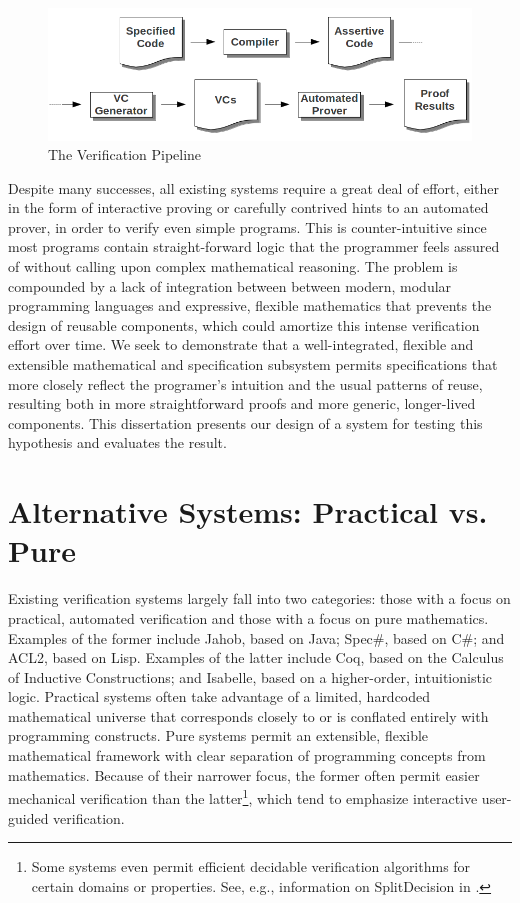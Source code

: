 \begin{figure}
  \centering
    \includegraphics[width=\textwidth]{verification_pipeline}
  \caption{The Verification Pipeline\label{fig:pipeline}}
\end{figure}

Despite many successes, all existing systems require a great deal of effort, either in the form of interactive proving or carefully contrived hints to an automated prover, in order to verify even simple programs.  This is counter-intuitive since most programs contain straight-forward logic that the programmer feels assured of without calling upon complex mathematical reasoning.  The problem is compounded by a lack of integration between between modern, modular programming languages and expressive, flexible mathematics that prevents the design of reusable components, which could amortize this intense verification effort over time.  We seek to demonstrate that a well-integrated, flexible and extensible mathematical and specification subsystem permits specifications that more closely reflect the programer's intuition and the usual patterns of reuse, resulting both in more straightforward proofs and more generic, longer-lived components.  This dissertation presents our design of a system for testing this hypothesis and evaluates the result.

\section{Alternative Systems: Practical vs. Pure}
Existing verification systems largely fall into two categories: those with a focus on practical, automated verification and those with a focus on pure mathematics.  Examples of the former include Jahob\cite{kuncakJahobOverview}, based on Java; Spec\#\cite{specsharp}, based on C\#; and ACL2\cite{kaufmannACL2}, based on Lisp.  Examples of the latter include Coq\cite{coq}, based on the Calculus of Inductive Constructions; and Isabelle\cite{nipkowIsabelle}, based on a higher-order, intuitionistic logic.  Practical systems often take advantage of a limited, hardcoded mathematical universe that corresponds closely to or is conflated entirely with programming constructs.  Pure systems permit an extensible, flexible mathematical framework with clear separation of programming concepts from mathematics.  Because of their narrower focus, the former often permit easier mechanical verification than the latter\footnote{Some systems even permit efficient decidable verification algorithms for certain domains or properties.  See, e.g., information on SplitDecision in \cite{Sit11}.}, which tend to emphasize interactive user-guided verification.

